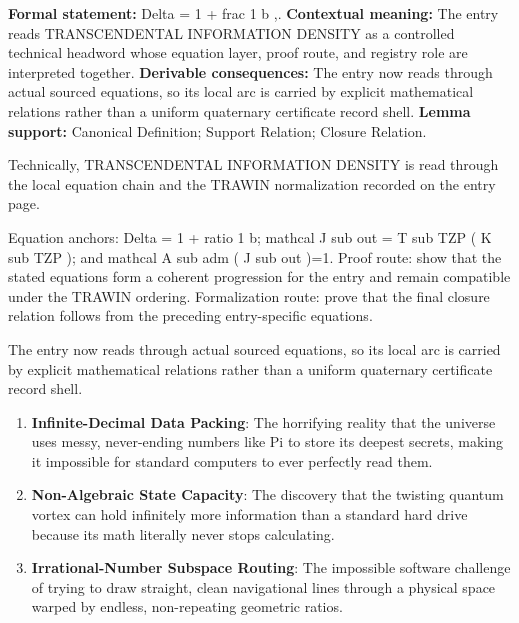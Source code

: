 \begingroup\footnotesize\setlength{\emergencystretch}{3em}\sloppy
\textbf{Formal statement:} Delta = 1 + frac 1 b ,. \textbf{Contextual meaning:} The entry reads TRANSCENDENTAL INFORMATION DENSITY as a controlled technical headword whose equation layer, proof route, and registry role are interpreted together. \textbf{Derivable consequences:} The entry now reads through actual sourced equations, so its local arc is carried by explicit mathematical relations rather than a uniform quaternary certificate record shell. \textbf{Lemma support:} Canonical Definition; Support Relation; Closure Relation.\par
\endgroup

Technically, TRANSCENDENTAL INFORMATION DENSITY is read through the local equation chain and the TRAWIN normalization recorded on the entry page.

Equation anchors: Delta = 1 + ratio 1 b; mathcal J sub out = T sub TZP ( K sub TZP ); and mathcal A sub adm ( J sub out )=1. Proof route: show that the stated equations form a coherent progression for the entry and remain compatible under the TRAWIN ordering. Formalization route: prove that the final closure relation follows from the preceding entry-specific equations.

The entry now reads through actual sourced equations, so its local arc is carried by explicit mathematical relations rather than a uniform quaternary certificate record shell.
\endgroup

\begin{enumerate}[leftmargin=1.6em,itemsep=6pt,topsep=4pt]
\item \textbf{Infinite-Decimal Data Packing}: The horrifying reality that the universe uses messy, never-ending numbers like Pi to store its deepest secrets, making it impossible for standard computers to ever perfectly read them.
\item \textbf{Non-Algebraic State Capacity}: The discovery that the twisting quantum vortex can hold infinitely more information than a standard hard drive because its math literally never stops calculating.
\item \textbf{Irrational-Number Subspace Routing}: The impossible software challenge of trying to draw straight, clean navigational lines through a physical space warped by endless, non-repeating geometric ratios.
\end{enumerate}


